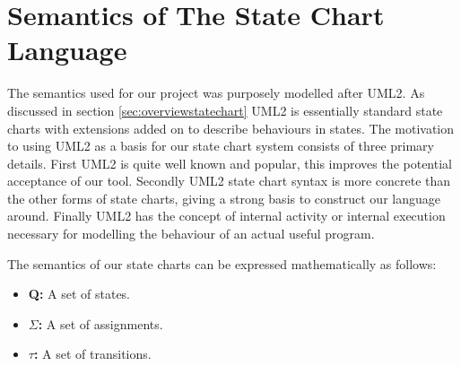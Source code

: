 \section{Semantics of The State Chart Language}

The semantics used for our project was purposely modelled after UML2. As discussed in section \ref{sec:overviewstatechart} UML2 is essentially standard state charts with extensions added on to describe behaviours in states. The motivation to using UML2 as a basis for our state chart system consists of three primary details. First UML2 is quite well known and popular, this improves the potential acceptance of our tool. Secondly UML2 state chart syntax is more concrete than the other forms of state charts, giving a strong basis to construct our language around. Finally UML2 has the concept of internal activity or internal execution necessary for modelling the behaviour of an actual useful program.

The semantics of our state charts can be expressed mathematically as follows:

\begin{itemize}
	\item \textbf{Q:} A set of states.
	\item \textbf{$\Sigma$:} A set of assignments.
	\item \textbf{$\tau$:} A set of transitions.
\end{itemize}